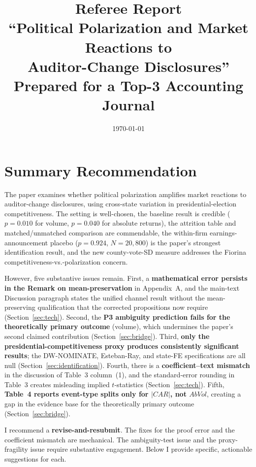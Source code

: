 \documentclass[11pt]{article}
\title{Referee Report\\[6pt]
\large ``Political Polarization and Market Reactions to\\Auditor-Change Disclosures''\\[4pt]
\normalsize Prepared for a Top-3 Accounting Journal}
\author{}
\date{\today}
\begin{document}
\maketitle
\onehalfspacing

\tableofcontents
\newpage

\section*{Summary Recommendation}

The paper examines whether political polarization amplifies market reactions to auditor-change disclosures, using cross-state variation in presidential-election competitiveness. The setting is well-chosen, the baseline result is credible ($p = 0.010$ for volume, $p = 0.040$ for absolute returns), the attrition table and matched/unmatched comparison are commendable, the within-firm earnings-announcement placebo ($p = 0.924$, $N = 20{,}800$) is the paper's strongest identification result, and the new county-vote-SD measure addresses the Fiorina competitiveness-vs.-polarization concern.

However, five substantive issues remain. First, a \textbf{mathematical error persists in the Remark on mean-preservation} in Appendix~A, and the main-text Discussion paragraph states the unified channel result without the mean-preserving qualification that the corrected propositions now require (Section~\ref{sec:tech}). Second, the \textbf{P3 ambiguity prediction fails for the theoretically primary outcome} (volume), which undermines the paper's second claimed contribution (Section~\ref{sec:bridge}). Third, \textbf{only the presidential-competitiveness proxy produces consistently significant results}; the DW-NOMINATE, Esteban-Ray, and state-FE specifications are all null (Section~\ref{sec:identification}). Fourth, there is a \textbf{coefficient--text mismatch} in the discussion of Table~3 column~(1), and the standard-error rounding in Table~3 creates misleading implied $t$-statistics (Section~\ref{sec:tech}). Fifth, \textbf{Table~4 reports event-type splits only for $|CAR|$, not $AbVol$}, creating a gap in the evidence base for the theoretically primary outcome (Section~\ref{sec:bridge}).

I recommend a \textbf{revise-and-resubmit}. The fixes for the proof error and the coefficient mismatch are mechanical. The ambiguity-test issue and the proxy-fragility issue require substantive engagement. Below I provide specific, actionable suggestions for each.
\end{document}
